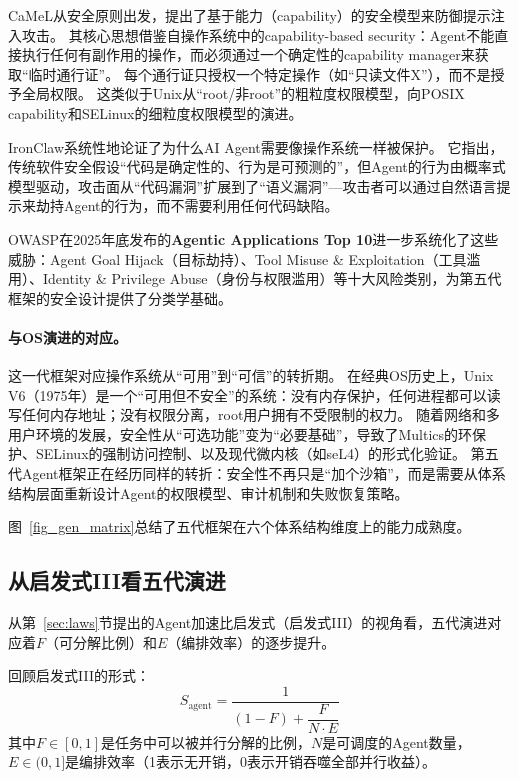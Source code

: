 CaMeL\cite{debenedetti2025camel}从安全原则出发，提出了基于能力（capability）的安全模型来防御提示注入攻击。
其核心思想借鉴自操作系统中的capability-based security：Agent不能直接执行任何有副作用的操作，而必须通过一个确定性的capability manager来获取``临时通行证''。
每个通行证只授权一个特定操作（如``只读文件X''），而不是授予全局权限。
这类似于Unix从``root/非root''的粗粒度权限模型，向POSIX capability和SELinux的细粒度权限模型的演进。

IronClaw\cite{ironclaw2025}系统性地论证了为什么AI Agent需要像操作系统一样被保护。
它指出，传统软件安全假设``代码是确定性的、行为是可预测的''，但Agent的行为由概率式模型驱动，攻击面从``代码漏洞''扩展到了``语义漏洞''---攻击者可以通过自然语言提示来劫持Agent的行为，而不需要利用任何代码缺陷。

OWASP在2025年底发布的\textbf{Agentic Applications Top 10}\cite{owasp_agentic2026}进一步系统化了这些威胁：Agent Goal Hijack（目标劫持）、Tool Misuse \& Exploitation（工具滥用）、Identity \& Privilege Abuse（身份与权限滥用）等十大风险类别，为第五代框架的安全设计提供了分类学基础。

\paragraph{与OS演进的对应。}
这一代框架对应操作系统从``可用''到``可信''的转折期。
在经典OS历史上，Unix V6（1975年）是一个``可用但不安全''的系统：没有内存保护，任何进程都可以读写任何内存地址；没有权限分离，root用户拥有不受限制的权力。
随着网络和多用户环境的发展，安全性从``可选功能''变为``必要基础''，导致了Multics的环保护、SELinux的强制访问控制、以及现代微内核（如seL4）的形式化验证\cite{ostep_2023}。
第五代Agent框架正在经历同样的转折：安全性不再只是``加个沙箱''，而是需要从体系结构层面重新设计Agent的权限模型、审计机制和失败恢复策略。

图~\ref{fig_gen_matrix}总结了五代框架在六个体系结构维度上的能力成熟度。


\subsection{从启发式III看五代演进}

从第~\ref{sec:laws}节提出的Agent加速比启发式（启发式III）的视角看，五代演进对应着$F$（可分解比例）和$E$（编排效率）的逐步提升。

回顾启发式III的形式：
\begin{equation}
\label{eq:agent_law_review}
S_{\mathrm{agent}} = \frac{1}{(1-F) + \dfrac{F}{N \cdot E}}
\end{equation}
其中$F \in [0,1]$是任务中可以被并行分解的比例，$N$是可调度的Agent数量，$E \in (0,1]$是编排效率（1表示无开销，0表示开销吞噬全部并行收益）。

